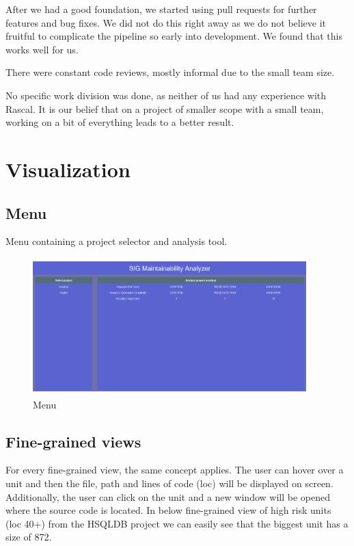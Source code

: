 \documentclass{article}
\begin{document}
After we had a good foundation, we started using pull requests for further features and bug fixes. We did not do this right away as we do not believe it fruitful to complicate the pipeline so early into development. We found that this works well for us.

There were constant code reviews, mostly informal due to the small team size.

No specific work division was done, as neither of us had any experience with Rascal. It is our belief that on a project of smaller scope with a small team, working on a bit of everything leads to a better result.




\clearpage
\appendix
\appendixpage{}

\section{Visualization}
\label{appendix:visualization}
\subsection{Menu}
Menu containing a project selector and analysis tool.
\begin{figure}[!htbp]
	\centering
	\label{fig:vis-menu}
	\caption{Menu}
	\includegraphics[width=400px, height=200px]{vis_menu.png}
\end{figure}

\subsection{Fine-grained views}
For every fine-grained view, the same concept applies. 
The user can hover over a unit and then the file, path and lines of code (loc) will be displayed on screen. 
Additionally, the user can click on the unit and a new window will be opened where the source code is located.
In below fine-grained view of high risk units (loc 40+) from the HSQLDB project we can easily see that the biggest unit has a size of 872. 
\end{document}
